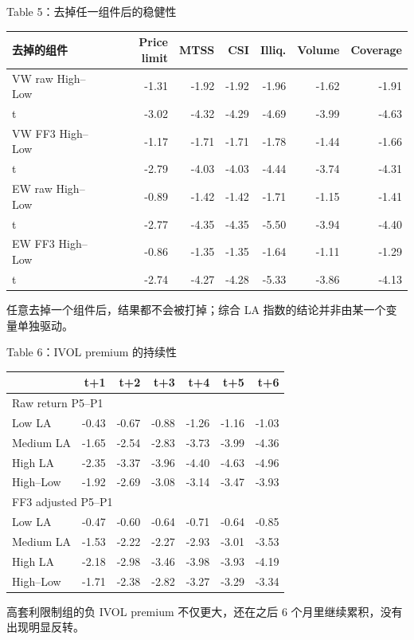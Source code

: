 \documentclass[aspectratio=169,10pt]{beamer}
\newcommand{\tinytab}{\tiny\setlength{\tabcolsep}{2.2pt}\renewcommand{\arraystretch}{1.08}}
\begin{document}
\begin{frame}{Table 5：去掉任一组件后的稳健性}
	\tinytab
	\begin{tabular}{lrrrrrr}
		\toprule
		去掉的组件 & Price limit & MTSS & CSI & Illiq. & Volume & Coverage\\
		\midrule
		VW raw High--Low & -1.31 & -1.92 & -1.92 & -1.96 & -1.62 & -1.91\\
		t & -3.02 & -4.32 & -4.29 & -4.69 & -3.99 & -4.63\\
		VW FF3 High--Low & -1.17 & -1.71 & -1.71 & -1.78 & -1.44 & -1.66\\
		t & -2.79 & -4.03 & -4.03 & -4.44 & -3.74 & -4.31\\
		EW raw High--Low & -0.89 & -1.42 & -1.42 & -1.71 & -1.15 & -1.41\\
		t & -2.77 & -4.35 & -4.35 & -5.50 & -3.94 & -4.40\\
		EW FF3 High--Low & -0.86 & -1.35 & -1.35 & -1.64 & -1.11 & -1.29\\
		t & -2.74 & -4.27 & -4.28 & -5.33 & -3.86 & -4.13\\
		\bottomrule
	\end{tabular}
	\par\vspace{5pt}
	\small 任意去掉一个组件后，结果都不会被打掉；综合 LA 指数的结论并非由某一个变量单独驱动。
\end{frame}

\begin{frame}{Table 6：IVOL premium 的持续性}
	\tinytab
	\begin{tabular}{lrrrrrr}
		\toprule
		& t+1 & t+2 & t+3 & t+4 & t+5 & t+6\\
		\midrule
		\multicolumn{7}{l}{Raw return P5--P1}\\
		Low LA & -0.43 & -0.67 & -0.88 & -1.26 & -1.16 & -1.03\\
		Medium LA & -1.65 & -2.54 & -2.83 & -3.73 & -3.99 & -4.36\\
		High LA & -2.35 & -3.37 & -3.96 & -4.40 & -4.63 & -4.96\\
		High--Low & -1.92 & -2.69 & -3.08 & -3.14 & -3.47 & -3.93\\
		\midrule
		\multicolumn{7}{l}{FF3 adjusted P5--P1}\\
		Low LA & -0.47 & -0.60 & -0.64 & -0.71 & -0.64 & -0.85\\
		Medium LA & -1.53 & -2.22 & -2.27 & -2.93 & -3.01 & -3.53\\
		High LA & -2.18 & -2.98 & -3.46 & -3.98 & -3.93 & -4.19\\
		High--Low & -1.71 & -2.38 & -2.82 & -3.27 & -3.29 & -3.34\\
		\bottomrule
	\end{tabular}
	\par\vspace{5pt}
	\small 高套利限制组的负 IVOL premium 不仅更大，还在之后 6 个月里继续累积，没有出现明显反转。
\end{frame}
\end{document}
